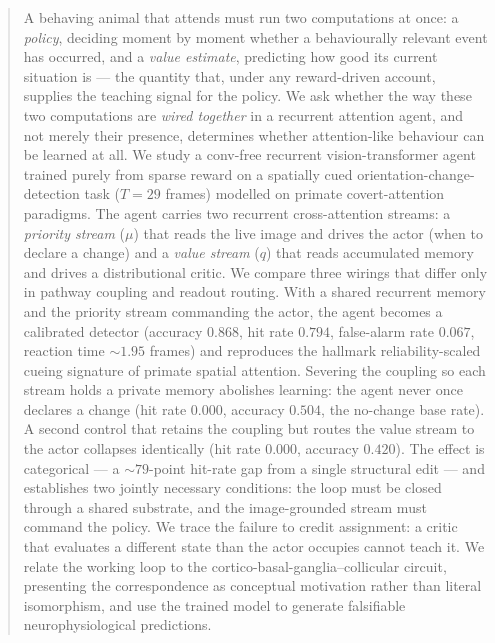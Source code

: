 \begin{abstract}
\noindent
A behaving animal that attends must run two computations at once: a \emph{policy}, deciding moment by moment whether a behaviourally relevant event has occurred, and a \emph{value estimate}, predicting how good its current situation is --- the quantity that, under any reward-driven account, supplies the teaching signal for the policy. We ask whether the way these two computations are \emph{wired together} in a recurrent attention agent, and not merely their presence, determines whether attention-like behaviour can be learned at all. We study a conv-free recurrent vision-transformer agent trained purely from sparse reward on a spatially cued orientation-change-detection task ($T=29$ frames) modelled on primate covert-attention paradigms. The agent carries two recurrent cross-attention streams: a \emph{priority stream} ($\mu$) that reads the live image and drives the actor (when to declare a change) and a \emph{value stream} ($q$) that reads accumulated memory and drives a distributional critic. We compare three wirings that differ only in pathway coupling and readout routing. With a shared recurrent memory and the priority stream commanding the actor, the agent becomes a calibrated detector (accuracy $0.868$, hit rate $0.794$, false-alarm rate $0.067$, reaction time $\sim$$1.95$ frames) and reproduces the hallmark reliability-scaled cueing signature of primate spatial attention. Severing the coupling so each stream holds a private memory abolishes learning: the agent never once declares a change (hit rate $0.000$, accuracy $0.504$, the no-change base rate). A second control that retains the coupling but routes the value stream to the actor collapses identically (hit rate $0.000$, accuracy $0.420$). The effect is categorical --- a $\sim$$79$-point hit-rate gap from a single structural edit --- and establishes two jointly necessary conditions: the loop must be closed through a shared substrate, and the image-grounded stream must command the policy. We trace the failure to credit assignment: a critic that evaluates a different state than the actor occupies cannot teach it. We relate the working loop to the cortico-basal-ganglia--collicular circuit, presenting the correspondence as conceptual motivation rather than literal isomorphism, and use the trained model to generate falsifiable neurophysiological predictions.
\end{abstract}
